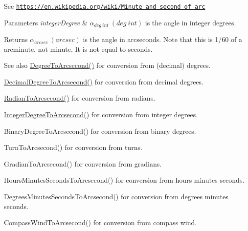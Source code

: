 See \href{https://en.wikipedia.org/wiki/Minute_and_second_of_arc}{\tt https\+://en.\+wikipedia.\+org/wiki/\+Minute\+\_\+and\+\_\+second\+\_\+of\+\_\+arc} 
\begin{DoxyParams}{Parameters}
{\em integer\+Degree} & $\alpha_{deg\ int}\ (deg\ int)$ is the angle in integer degrees. \\
\hline
\end{DoxyParams}
\begin{DoxyReturn}{Returns}
$\alpha_{arcsec}\ (arcsec)$ is the angle in arcseconds. Note that this is 1/60 of a arcminute, not minute. It is not equal to seconds. 
\end{DoxyReturn}
\begin{DoxySeeAlso}{See also}
\mbox{\hyperlink{group___e_g_x_math-_angle_conversions-_degree_gaf85e2d765c248f447854a807a68a5de8}{Degree\+To\+Arcsecond()}} for conversion from (decimal) degrees. 

\mbox{\hyperlink{group___e_g_x_math-_angle_conversions-_decimal_degree_gab9d5635a6e35127b5245978aba508962}{Decimal\+Degree\+To\+Arcsecond()}} for conversion from decimal degrees. 

\mbox{\hyperlink{group___e_g_x_math-_angle_conversions-_radian_ga2f952f6675a0fc54bf72bfe4e3d2664a}{Radian\+To\+Arcsecond()}} for conversion from radians. 

\mbox{\hyperlink{group___e_g_x_math-_angle_conversions-_integer_degree_gaa04058a2fea3dc3678264a05fac6e1ae}{Integer\+Degree\+To\+Arcsecond()}} for conversion from integer degrees. 

Binary\+Degree\+To\+Arcsecond() for conversion from binary degrees. 

Turn\+To\+Arcsecond() for conversion from turns. 

Gradian\+To\+Arcsecond() for conversion from gradians. 

Hours\+Minutes\+Seconds\+To\+Arcsecond() for conversion from hours minutes seconds. 

Degrees\+Minutes\+Seconds\+To\+Arcsecond() for conversion from degrees minutes seconds. 

Compass\+Wind\+To\+Arcsecond() for conversion from compass wind. 
\end{DoxySeeAlso}
\mbox{\label{group___e_g_x_math-_angle_conversions-_integer_degree_ga694bbfe624c3c14e97ce6155ca9bc44d}} 
